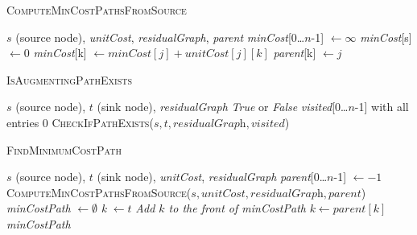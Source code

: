 \documentclass{article}
\begin{document}
\begin{algorithm}[H]
\caption{\textcolor{keywordcolor}{\textsc{ComputeMinCostPathsFromSource}}}
\begin{algorithmic}[1]
\State {} $s$ (source node), \textit{unitCost}, \textit{residualGraph}, \textit{parent}
\State {} \textit{minCost}[0…$n$-1] $\gets \infty$
\State \textit{minCost}[s] $\gets 0$
                        \State \textit{minCost}[k] $\gets \textit{minCost}[j] + \textit{unitCost}[j][k]$
                        \State \textit{parent}[k] $\gets j$
                    \EndIf
                \EndIf
            \EndIf
        \EndFor
    \EndFor
\EndFor
\end{algorithmic}
\end{algorithm}


\begin{algorithm}[H]
\caption{\textcolor{keywordcolor}{\textsc{IsAugmentingPathExists}}}
\begin{algorithmic}[1]
\State {} $s$ (source node), $t$ (sink node), \textit{residualGraph}
\State {} \textit{True} or \textit{False}
\State {} \textit{visited}[0…$n$-1] with all entries 0
\State \Return \textcolor{identifiercolor}{\textsc{CheckIfPathExists}}($s, t, \textit{residualGraph}, \textit{visited}$)
\end{algorithmic}
\end{algorithm}

\begin{algorithm}[H]
\caption{\textcolor{keywordcolor}{\textsc{FindMinimumCostPath}}}
\begin{algorithmic}[1]
\State {} $s$ (source node), $t$ (sink node), \textit{unitCost}, \textit{residualGraph}
\State {} \textit{parent}[0…$n$-1] $\gets -1$
\State \textcolor{identifiercolor}{\textsc{ComputeMinCostPathsFromSource}}($s, \textit{unitCost}, \textit{residualGraph}, \textit{parent}$)
\State {} \textit{minCostPath} $\gets \emptyset$
\State \textit{k} $\gets t$
    \State \textit{Add $k$ to the front of minCostPath}
    \State $k \gets \textit{parent}[k]$
\EndWhile
\State \Return \textit{minCostPath}
\end{algorithmic}
\end{algorithm}
\end{document}
